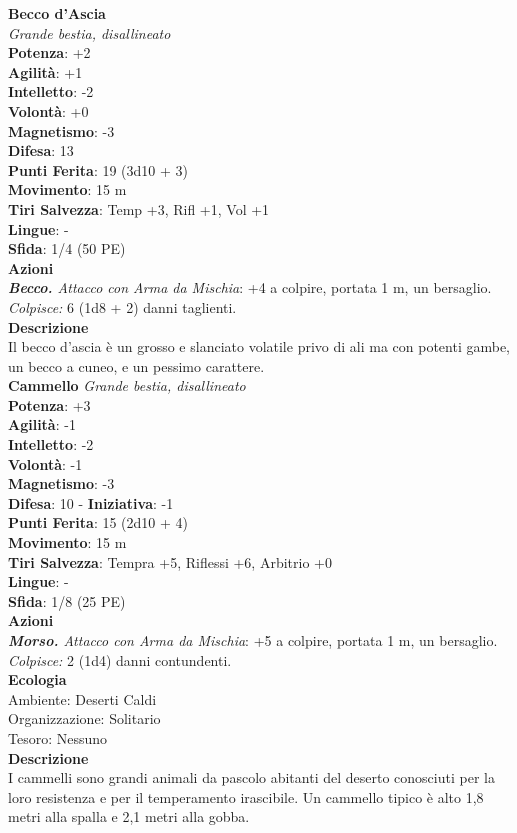\begin{multicols}{2}
\medskip\textbf{Becco d'Ascia}\\
\emph{Grande bestia, disallineato}\\
\textbf{Potenza}: +2\\
\textbf{Agilità}: +1\\
\textbf{Intelletto}: -2\\
\textbf{Volontà}: +0\\
\textbf{Magnetismo}: -3\\
\textbf{Difesa}: 13\\
\textbf{Punti Ferita}: 19 (3d10 + 3)\\
\textbf{Movimento}: 15 m\\
\textbf{Tiri Salvezza}: Temp +3, Rifl +1, Vol +1\\
\textbf{Lingue}: -\\
\textbf{Sfida}: 1/4 (50 PE)\smallskip\\
\smallskip\textbf{Azioni}\\
\emph{\textbf{Becco.} Attacco con Arma da Mischia}: +4 a colpire, portata 1 m, un bersaglio.\\
\emph{Colpisce:} 6 (1d8 + 2) danni taglienti.\\

\textbf{Descrizione}\\
Il becco d'ascia è un grosso e slanciato volatile privo di ali ma con potenti gambe, un becco a cuneo, e un pessimo carattere.\\

\medskip\textbf{Cammello}
\emph{Grande bestia, disallineato}\\
\textbf{Potenza}: +3\\
\textbf{Agilità}: -1\\
\textbf{Intelletto}: -2\\
\textbf{Volontà}: -1\\
\textbf{Magnetismo}: -3\\
\textbf{Difesa}: 10 - \textbf{Iniziativa}: -1\\
\textbf{Punti Ferita}: 15 (2d10 + 4)\\
\textbf{Movimento}: 15 m\\
\textbf{Tiri Salvezza}: Tempra +5, Riflessi +6, Arbitrio +0 \\
\textbf{Lingue}: -\\
\textbf{Sfida}: 1/8 (25 PE)\smallskip\\
\smallskip\textbf{Azioni}\\
\emph{\textbf{Morso.} Attacco con Arma da Mischia}: +5 a colpire, portata 1 m, un bersaglio.\\
\emph{Colpisce:} 2 (1d4) danni contundenti.\\
\textbf{Ecologia}\\
Ambiente: Deserti Caldi\\
Organizzazione: Solitario\\
Tesoro: Nessuno\\
\textbf{Descrizione}\\
I cammelli sono grandi animali da pascolo abitanti del deserto conosciuti per la loro resistenza e per il temperamento irascibile. Un cammello tipico è alto 1,8 metri alla spalla e 2,1 metri alla gobba. \\


\end{multicols}
